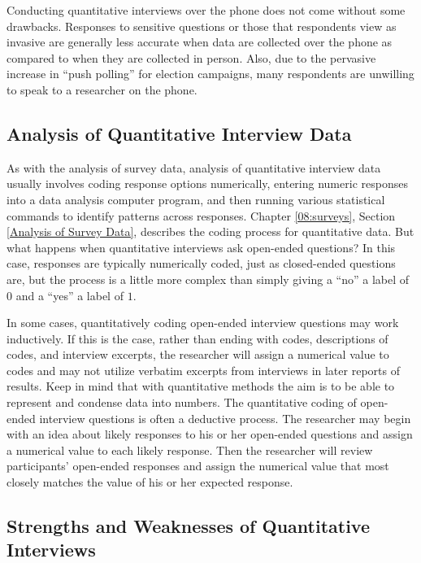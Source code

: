 Conducting quantitative interviews over the phone does not come without some drawbacks. Responses to sensitive questions or those that respondents view as invasive are generally less accurate when data are collected over the phone as compared to when they are collected in person. Also, due to the pervasive increase in ``push polling'' for election campaigns, many respondents are unwilling to speak to a researcher on the phone.

\subsection{Analysis of Quantitative Interview Data}

As with the analysis of survey data, analysis of quantitative interview data usually involves coding response options numerically, entering numeric responses into a data analysis computer program, and then running various statistical commands to identify patterns across responses. Chapter \ref{08:surveys}, Section \ref{Analysis of Survey Data},  describes the coding process for quantitative data. But what happens when quantitative interviews ask open-ended questions? In this case, responses are typically numerically coded, just as closed-ended questions are, but the process is a little more complex than simply giving a ``no'' a label of $ 0 $ and a ``yes'' a label of $ 1 $.

In some cases, quantitatively coding open-ended interview questions may work inductively. If this is the case, rather than ending with codes, descriptions of codes, and interview excerpts, the researcher will assign a numerical value to codes and may not utilize verbatim excerpts from interviews in later reports of results. Keep in mind that with quantitative methods the aim is to be able to represent and condense data into numbers. The quantitative coding of open-ended interview questions is often a deductive process. The researcher may begin with an idea about likely responses to his or her open-ended questions and assign a numerical value to each likely response. Then the researcher will review participants' open-ended responses and assign the numerical value that most closely matches the value of his or her expected response.

\subsection{Strengths and Weaknesses of Quantitative Interviews}

